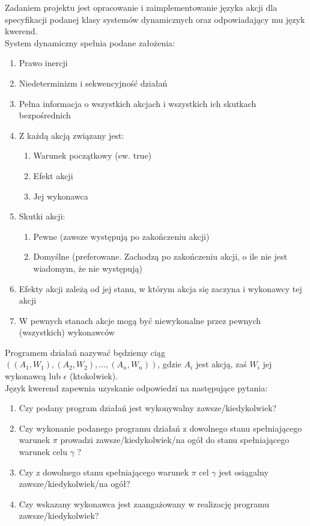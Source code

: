 \documentclass{article}
\begin{document}
Zadaniem projektu jest opracowanie i zaimplementowanie języka akcji dla specyfikacji podanej klasy systemów dynamicznych oraz odpowiadający mu język kwerend.\\

System dynamiczny spełnia podane założenia:
\begin{enumerate}
\item Prawo inercji
\item Niedeterminizm i sekwencyjność działań
\item Pełna informacja o wszystkich akcjach i wszystkich ich skutkach bezpośrednich
\item Z każdą akcją związany jest:
\begin{enumerate}
\item Warunek początkowy (ew. true)
\item Efekt akcji
\item Jej wykonawca
\end{enumerate}
\item Skutki akcji:
\begin{enumerate}
\item Pewne (zawsze występują po zakończeniu akcji)
\item Domyślne (preferowane. Zachodzą po zakończeniu akcji, o ile nie jest wiadomym, że nie występują)
\end{enumerate}
\item Efekty akcji zależą od jej stanu, w którym akcja się zaczyna i wykonawcy tej akcji
\item W pewnych stanach akcje mogą być niewykonalne przez pewnych (wszystkich) wykonawców
\end{enumerate}

Programem działań nazywać będziemy ciąg $((A_{1},W_{1}), (A_{2},W_{2}), …, (A_{n},W_{n}))$, 
gdzie $A_{i}$ jest akcją, zaś $W_{i}$ jej wykonawcą lub $\epsilon$ (ktokolwiek).\\


Język kwerend zapewnia uzyskanie odpowiedzi na następujące pytania:
\begin{enumerate}
\item Czy podany program działań jest wykonywalny zawsze/kiedykolwiek?
\item Czy wykonanie podanego programu działań z dowolnego stanu spełniającego warunek $\pi$ prowadzi zawsze/kiedykolwiek/na ogół do stanu spełniającego warunek celu $\gamma$ ?
\item Czy z dowolnego stanu spełniającego warunek $\pi$ cel $\gamma$ jest osiągalny zawsze/kiedykolwiek/na ogół?
\item Czy wskazany wykonawca jest zaangażowany w realizację programu zawsze/kiedykolwiek?
\end{enumerate}
\end{document}
